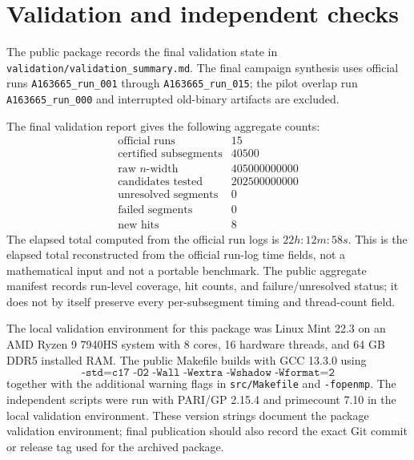 \documentclass[11pt]{article}
\theoremstyle{definition}
\theoremstyle{remark}
\begin{document}
\section{Validation and independent checks}

The public package records the final validation state in
\texttt{validation/validation\_summary.md}.  The final campaign synthesis
uses official runs \texttt{A163665\_run\_001} through
\texttt{A163665\_run\_015}; the pilot overlap run
\texttt{A163665\_run\_000} and interrupted old-binary artifacts are
excluded.

The final validation report gives the following aggregate counts:
\[
\begin{array}{lr}
\text{official runs} & 15\\
\text{certified subsegments} & 40500\\
\text{raw }n\text{-width} & 405000000000\\
\text{candidates tested} & 202500000000\\
\text{unresolved segments} & 0\\
\text{failed segments} & 0\\
\text{new hits} & 8
\end{array}
\]
The elapsed total computed from the official run logs is \(22h{:}12m{:}58s\).
This is the elapsed total reconstructed from the official run-log time
fields, not a mathematical input and not a portable benchmark.  The
public aggregate manifest records run-level coverage, hit counts, and
failure/unresolved status; it does not by itself preserve every
per-subsegment timing and thread-count field.

The local validation environment for this package was Linux Mint 22.3 on
an AMD Ryzen 9 7940HS system with 8 cores, 16 hardware threads, and
64 GB DDR5 installed RAM.  The public Makefile builds with GCC 13.3.0
using
\[
\texttt{-std=c17 -O2 -Wall -Wextra -Wshadow -Wformat=2}
\]
together with the additional warning flags in \texttt{src/Makefile} and
\texttt{-fopenmp}.  The independent scripts were run with PARI/GP 2.15.4
and primecount 7.10 in the local validation environment.  These version
strings document the package validation environment; final publication
should also record the exact Git commit or release tag used for the
archived package.
\end{document}
